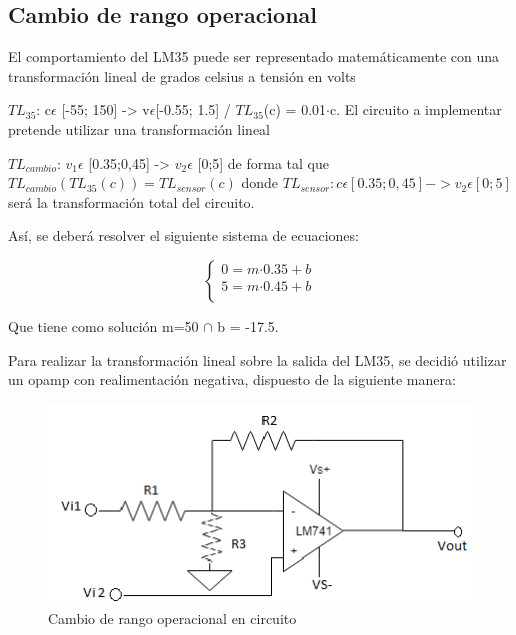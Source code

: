 \documentclass[../../main.tex]{subfiles}
\begin{document}
\subsection{Cambio de rango operacional}
\label{cambioRango} 	%
El comportamiento del LM35 puede ser representado matemáticamente con una transformación lineal de grados celsius a tensión en volts\par 
$TL_{35}$: c$\epsilon$ [-55; 150] -> v$\epsilon$[-0.55; 1.5] / $TL_{35}$(c) = 0.01$\cdot$c. 
El circuito a implementar pretende utilizar una transformación lineal\par
$TL_{cambio}$: $v_1\epsilon$ [0.35;0,45] -> $v_2\epsilon$ [0;5] de forma tal que 
$TL_{cambio}(TL_{35}(c))= TL_{sensor}(c)$ donde $TL_{sensor}: c\epsilon [0.35;0,45] -> v_2\epsilon[0;5]$ será la transformación total del circuito.

Así, se deberá resolver el siguiente sistema de ecuaciones:

	 \begin{equation}
  	   \left\{
	  	    \begin{array}{ll}
		 					0 = m\mathrm{\cdot}0.35 + b \\
			 				5 = m\mathrm{\cdot}0.45 + b \\
	     	 \end{array}
	     	\right.
 	\end{equation}

Que tiene como solución m=50 $\cap$ b = -17.5.

Para realizar la transformación lineal sobre la salida del LM35, se decidió utilizar un opamp con realimentación negativa, dispuesto de la siguiente manera:

\begin{figure}[H]	%
	\centering
	\includegraphics[scale=1.3]{imagenes/adder.png}
	\caption{Cambio de rango operacional en circuito}
	\label{fig:ej6_adder}
\end{figure}
\end{document}
